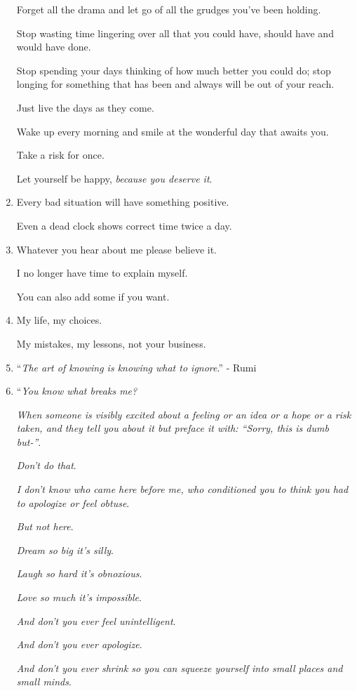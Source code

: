 \documentclass{article}
\begin{document}
\begin{enumerate}
	Forget all the drama and let go of all the grudges you've been holding.
	
	Stop wasting time lingering over all that you could have, should have and would have done.
	
	Stop spending your days thinking of how much better you could do; stop longing for something that has been and always will be out of your reach.
	
	Just live the days as they come.
	
	Wake up every morning and smile at the wonderful day that awaits you.
	
	Take a risk for once.
	
	Let yourself be happy, \textit{because you deserve it}.
	\item Every bad situation will have something positive.
	
	Even a dead clock shows correct time twice a day.
	\item Whatever you hear about me please believe it.
	
	I no longer have time to explain myself.
	
	You can also add some if you want.
	\item My life, my choices.
	
	My mistakes, my lessons, not your business.
	\item ``\textit{The art of knowing is knowing what to ignore}.'' - Rumi
	\item ``\textit{You know what breaks me?}
	
	\textit{When someone is visibly excited about a feeling or an idea or a hope or a risk taken, and they tell you about it but preface it with: ``Sorry, this is dumb but-''}.
	
	\textit{Don't do that}.
	
	\textit{I don't know who came here before me, who conditioned you to think you had to apologize or feel obtuse}.
	
	\textit{But not here}.
	
	\textit{Dream so big it's silly}.
	
	\textit{Laugh so hard it's obnoxious}.
	
	\textit{Love so much it's impossible}.
	
	\textit{And don't you ever feel unintelligent}.
	
	\textit{And don't you ever apologize}.
	
	\textit{And don't you ever shrink so you can squeeze yourself into small places and small minds}.
	

\end{enumerate}
\end{document}
